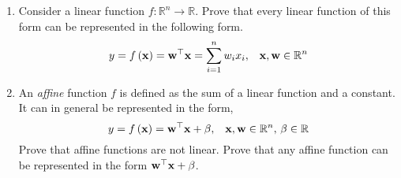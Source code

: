 \documentclass[12pt]{article}
\def\mf{\ensuremath\mathbf}
\begin{document}
\begin{enumerate}
    \item Consider a linear function $f: \mathbb{R}^n \rightarrow \mathbb{R}$. Prove that every linear function of this form can be represented in the following form.
    \[ y = f\left(\mf{x}\right) = \mf{w}^\top\mf{x} = \sum_{i=1}^{n}w_ix_i, \,\,\,\,\, \mf{x}, \mf{w} \in \mathbb{R}^n \]

    \item An \textit{affine} function $f$ is defined as the sum of a linear function and a constant. It can in general be represented in the form, 
    \[ y = f\left(\mf{x}\right) = \mf{w}^\top\mf{x} + \beta, \,\,\,\,\, \mf{x}, \mf{w} \in \mathbb{R}^n, \, \beta \in \mathbb{R} \]
    Prove that affine functions are not linear. Prove that any affine function can be represented in the form $\mf{w}^\top\mf{x} + \beta$.

    

\end{enumerate}
\end{document}
